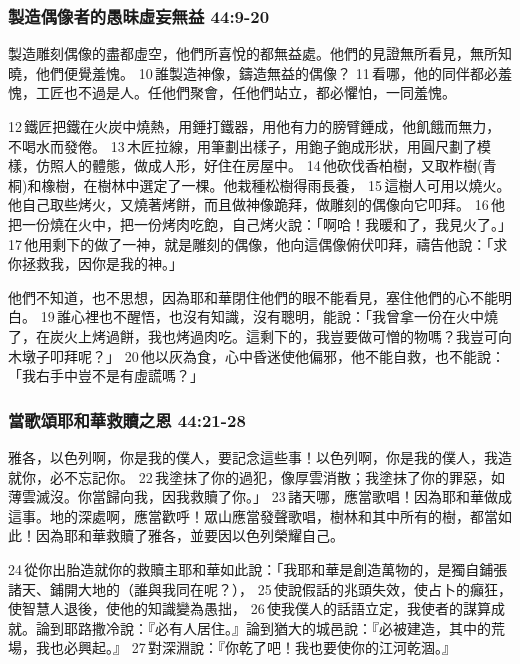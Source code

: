 \subsubsection{製造偶像者的愚昧虛妄無益 44:9-20}
製造雕刻偶像的盡都虛空，他們所喜悅的都無益處。他們的見證無所看見，無所知曉，他們便覺羞愧。 10 誰製造神像，鑄造無益的偶像？ 11 看哪，他的同伴都必羞愧，工匠也不過是人。任他們聚會，任他們站立，都必懼怕，一同羞愧。

12 鐵匠把鐵在火炭中燒熱，用錘打鐵器，用他有力的膀臂錘成，他飢餓而無力，不喝水而發倦。 13 木匠拉線，用筆劃出樣子，用鉋子鉋成形狀，用圓尺劃了模樣，仿照人的體態，做成人形，好住在房屋中。 14 他砍伐香柏樹，又取柞樹(青桐)和橡樹，在樹林中選定了一棵。他栽種松樹得雨長養， 15 這樹人可用以燒火。他自己取些烤火，又燒著烤餅，而且做神像跪拜，做雕刻的偶像向它叩拜。 16 他把一份燒在火中，把一份烤肉吃飽，自己烤火說：「啊哈！我暖和了，我見火了。」 17 他用剩下的做了一神，就是雕刻的偶像，他向這偶像俯伏叩拜，禱告他說：「求你拯救我，因你是我的神。」

他們不知道，也不思想，因為耶和華閉住他們的眼不能看見，塞住他們的心不能明白。 19 誰心裡也不醒悟，也沒有知識，沒有聰明，能說：「我曾拿一份在火中燒了，在炭火上烤過餅，我也烤過肉吃。這剩下的，我豈要做可憎的物嗎？我豈可向木墩子叩拜呢？」 20 他以灰為食，心中昏迷使他偏邪，他不能自救，也不能說：「我右手中豈不是有虛謊嗎？」

\subsubsection{當歌頌耶和華救贖之恩 44:21-28}
雅各，以色列啊，你是我的僕人，要記念這些事！以色列啊，你是我的僕人，我造就你，必不忘記你。 22 我塗抹了你的過犯，像厚雲消散；我塗抹了你的罪惡，如薄雲滅沒。你當歸向我，因我救贖了你。」 23 諸天哪，應當歌唱！因為耶和華做成這事。地的深處啊，應當歡呼！眾山應當發聲歌唱，樹林和其中所有的樹，都當如此！因為耶和華救贖了雅各，並要因以色列榮耀自己。

24 從你出胎造就你的救贖主耶和華如此說：「我耶和華是創造萬物的，是獨自鋪張諸天、鋪開大地的（誰與我同在呢？）， 25 使說假話的兆頭失效，使占卜的癲狂，使智慧人退後，使他的知識變為愚拙， 26 使我僕人的話語立定，我使者的謀算成就。論到耶路撒冷說：『必有人居住。』論到猶大的城邑說：『必被建造，其中的荒場，我也必興起。』 27 對深淵說：『你乾了吧！我也要使你的江河乾涸。』 

